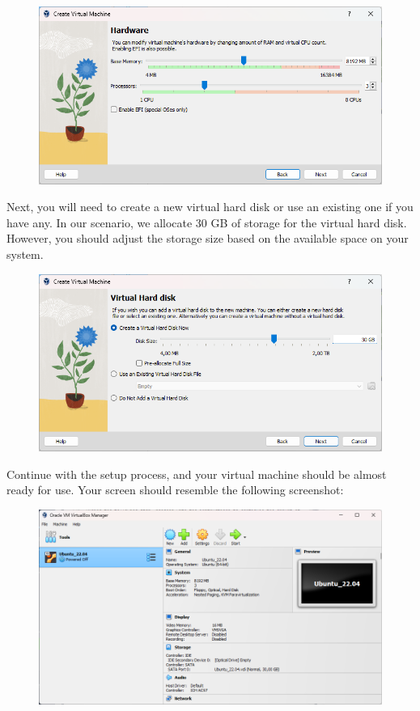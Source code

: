 \documentclass{article}
\begin{document}
\begin{figure}[H]
    \centering
    \includegraphics[width=\textwidth]{img/2./virtual_box3_english.png}
\end{figure}

\noindent
Next, you will need to create a new virtual hard disk or use an existing one if you have any. In our scenario, we allocate 30 GB of storage for the virtual hard disk. However, you should adjust the storage size based on the available space on your system.

\begin{figure}[H]
    \centering
    \includegraphics[width=\textwidth]{img/2./virtual_box4_english.png}
\end{figure}

\noindent       
Continue with the setup process, and your virtual machine should be almost ready for use. Your screen should resemble the following screenshot:

\begin{figure}[H]
    \centering
    \includegraphics[width=\textwidth]{img/2./virtual_box5_english.png}
\end{figure}
\end{document}
